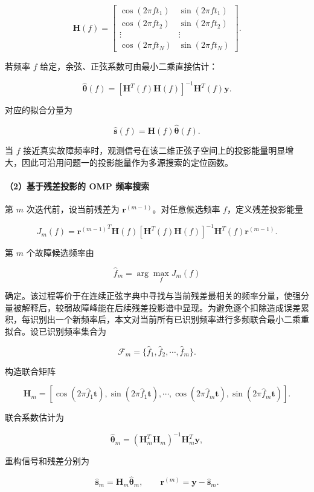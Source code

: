 \[
\mathbf H(f)=
\begin{bmatrix}
\cos(2\pi f t_1)&\sin(2\pi f t_1)\\
\cos(2\pi f t_2)&\sin(2\pi f t_2)\\
\vdots&\vdots\\
\cos(2\pi f t_N)&\sin(2\pi f t_N)
\end{bmatrix}.
\]


若频率 \(f\) 给定，余弦、正弦系数可由最小二乘直接估计：


\[
\hat{\boldsymbol\theta}(f)
=
\left[\mathbf H^T(f)\mathbf H(f)\right]^{-1}
\mathbf H^T(f)\mathbf y.
\]


对应的拟合分量为


\[
\hat{\mathbf s}(f)=\mathbf H(f)\hat{\boldsymbol\theta}(f).
\]


当 \(f\) 接近真实故障频率时，观测信号在该二维正弦子空间上的投影能量明显增大，因此可沿用问题一的投影能量作为多源搜索的定位函数。


\paragraph{（2）基于残差投影的 OMP 频率搜索}


第 \(m\) 次迭代前，设当前残差为 \(\mathbf r^{(m-1)}\)。对任意候选频率 \(f\)，定义残差投影能量


\[
J_m(f)=
{\mathbf r^{(m-1)}}^{T}\mathbf H(f)
\left[\mathbf H^{T}(f)\mathbf H(f)\right]^{-1}
\mathbf H^{T}(f)\mathbf r^{(m-1)}.
\]


第 \(m\) 个故障候选频率由


\[
\hat f_m=\arg\max_f J_m(f)
\]


确定。该过程等价于在连续正弦字典中寻找与当前残差最相关的频率分量，使强分量被解释后，较弱故障峰能在后续残差投影谱中显现。为避免逐个扣除造成误差累积，每识别出一个新频率后，本文对当前所有已识别频率进行多频联合最小二乘重拟合。设已识别频率集合为


\[
\mathcal F_m=\{\hat f_1,\hat f_2,\cdots,\hat f_m\}.
\]


构造联合矩阵


\[
\mathbf H_m=
\left[
\cos(2\pi \hat f_1\mathbf t),\sin(2\pi \hat f_1\mathbf t),
\cdots,
\cos(2\pi \hat f_m\mathbf t),\sin(2\pi \hat f_m\mathbf t)
\right].
\]


联合系数估计为


\[
\hat{\boldsymbol\theta}_m
=
(\mathbf H_m^T\mathbf H_m)^{-1}\mathbf H_m^T\mathbf y,
\]


重构信号和残差分别为


\[
\hat{\mathbf s}_m=\mathbf H_m\hat{\boldsymbol\theta}_m,
\qquad
\mathbf r^{(m)}=\mathbf y-\hat{\mathbf s}_m.
\]


